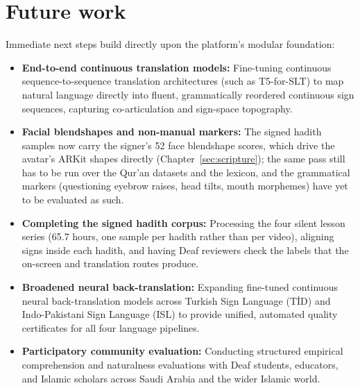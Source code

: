 \section{Future work}
Immediate next steps build directly upon the platform's modular foundation:
\begin{itemize}[leftmargin=*,itemsep=2pt]
  \item \textbf{End-to-end continuous translation models:} Fine-tuning continuous sequence-to-sequence translation architectures (such as T5-for-SLT) to map natural language directly into fluent, grammatically reordered continuous sign sequences, capturing co-articulation and sign-space topography.
  \item \textbf{Facial blendshapes and non-manual markers:} The signed hadith samples now carry the signer's 52 face blendshape scores, which drive the avatar's ARKit shapes directly (Chapter~\ref{sec:scripture}); the same pass still has to be run over the Qur'an datasets and the lexicon, and the grammatical markers (questioning eyebrow raises, head tilts, mouth morphemes) have yet to be evaluated as such.
  \item \textbf{Completing the signed hadith corpus:} Processing the four silent lesson series (65.7 hours, one sample per hadith rather than per video), aligning signs inside each hadith, and having Deaf reviewers check the labels that the on-screen and translation routes produce.
  \item \textbf{Broadened neural back-translation:} Expanding fine-tuned continuous neural back-translation models across Turkish Sign Language (T\.{I}D) and Indo-Pakistani Sign Language (ISL) to provide unified, automated quality certificates for all four language pipelines.
  \item \textbf{Participatory community evaluation:} Conducting structured empirical comprehension and naturalness evaluations with Deaf students, educators, and Islamic scholars across Saudi Arabia and the wider Islamic world.
\end{itemize}
